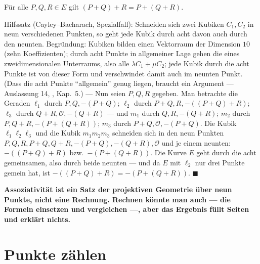 \begin{merksatz}
Für alle $P, Q, R\in E$ gilt $(P + Q) + R = P + (Q + R)$.

Hilfssatz (Cayley--Bacharach, Spezialfall): Schneiden sich zwei Kubiken $C_1, C_2$ in neun verschiedenen Punkten, so geht jede Kubik durch acht davon auch durch den neunten. Begründung: Kubiken bilden einen Vektorraum der Dimension $10$ (zehn Koeffizienten); durch acht Punkte in allgemeiner Lage gehen die eines zweidimensionalen Unterraums, also alle $\lambda C_1 + \mu C_2$; jede Kubik durch die acht Punkte ist von dieser Form und verschwindet damit auch im neunten Punkt. (Dass die acht Punkte \enquote{allgemein} genug liegen, braucht ein Argument --- Auslassung 14, , Kap.~5.) --- Nun seien $P, Q, R$ gegeben. Man betrachte die Geraden $\ell_1$ durch $P, Q, -(P+Q)$; $\ell_2$ durch $P + Q, R, -((P+Q)+R)$; $\ell_3$ durch $Q + R, \mathcal O, -(Q+R)$ --- und $m_1$ durch $Q, R, -(Q+R)$; $m_2$ durch $P, Q + R, -(P+(Q+R))$; $m_3$ durch $P + Q, \mathcal O, -(P+Q)$. Die Kubik $\ell_1\ell_2\ell_3$ und die Kubik $m_1m_2m_3$ schneiden sich in den neun Punkten $P, Q, R, P+Q, Q+R, -(P+Q), -(Q+R), \mathcal O$ und je einem neunten: $-((P+Q)+R)$ bzw.\ $-(P+(Q+R))$. Die Kurve $E$ geht durch die acht gemeinsamen, also durch beide neunten --- und da $E$ mit $\ell_2$ nur drei Punkte gemein hat, ist $-((P+Q)+R) = -(P+(Q+R))$. $\blacksquare$

\begin{center}
\begin{minipage}{0.9\textwidth}
\textbf{Assoziativität ist ein Satz der projektiven Geometrie über neun Punkte, nicht eine Rechnung. Rechnen könnte man auch --- die Formeln einsetzen und vergleichen ---, aber das Ergebnis füllt Seiten und erklärt nichts.}
\end{minipage}
\end{center}
\end{merksatz}

\section{Punkte zählen}

